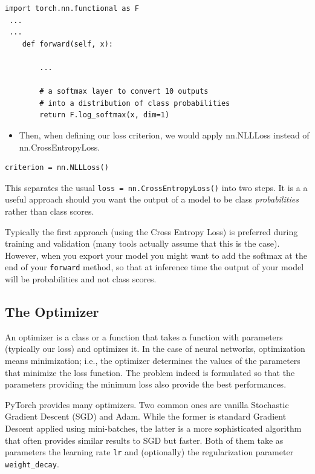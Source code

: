 \begin{lstlisting}
import torch.nn.functional as F
 ...
 ...
    def forward(self, x):

        ...

        # a softmax layer to convert 10 outputs 
        # into a distribution of class probabilities
        return F.log_softmax(x, dim=1)
\end{lstlisting}
\begin{itemize}
    \item Then, when defining our loss criterion, we would apply nn.NLLLoss instead of nn.CrossEntropyLoss.
\end{itemize}

\begin{lstlisting}
criterion = nn.NLLLoss()
\end{lstlisting}
This separates the usual \lstinline{loss = nn.CrossEntropyLoss()} into two steps. It is a a useful approach should you want the output of a model to be class \textit{probabilities} rather than class scores. \newline

Typically the first approach (using the Cross Entropy Loss) is preferred during training and validation (many tools actually assume that this is the case). However, when you export your model you might want to add the softmax at the end of your \lstinline|forward| method, so that at inference time the output of your model will be probabilities and not class scores.

\subsection{The Optimizer}

An optimizer is a class or a function that takes a function with parameters (typically our loss) and optimizes it. In the case of neural networks, optimization means minimization; i.e., the optimizer determines the values of the parameters that minimize the loss function. The problem indeed is formulated so that the parameters providing the minimum loss also provide the best performances. \newline

PyTorch provides many optimizers. Two common ones are vanilla Stochastic Gradient Descent (SGD) and Adam. While the former is standard Gradient Descent applied using mini-batches, the latter is a more sophisticated algorithm that often provides similar results to SGD but faster. Both of them take as parameters the learning rate \lstinline|lr| and (optionally) the regularization parameter \lstinline{weight_decay}. \newline

